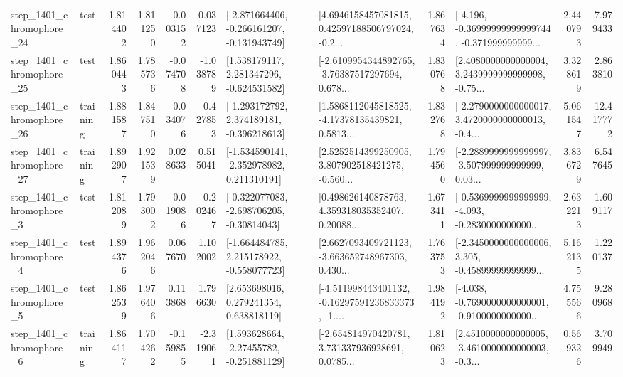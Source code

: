 \begin{tabular}{llrrrrllrlrr}
 step\_1401\_chromophore\_24 &      test &      1.814402 &    1.811250 &     -0.003152 &  0.037123 &  [-2.871664406, -0.266161207, -0.131943749] &  [4.6946158457081815, 0.42597188506797024, -0.2... &       1.867634 &  [-4.196, -0.36999999999999744, -0.371999999999... &            2.440793 &          7.979433 \\
 step\_1401\_chromophore\_25 &      test &      1.860443 &    1.785736 &     -0.074708 & -1.038789 &    [1.538179117, 2.281347296, -0.624531582] &  [-2.6109954344892765, -3.76387517297694, 0.678... &       1.830768 &  [2.4080000000000004, 3.2439999999999998, -0.75... &            3.328619 &          2.863810 \\
 step\_1401\_chromophore\_26 &  training &      1.881587 &    1.847510 &     -0.034076 & -0.427853 &   [-1.293172792, 2.374189181, -0.396218613] &  [1.5868112045818525, -4.17378135439821, 0.5813... &       1.832768 &  [-2.2790000000000017, 3.4720000000000013, -0.4... &            5.061547 &         12.417772 \\
 step\_1401\_chromophore\_27 &  training &      1.892907 &    1.921539 &      0.028633 &  0.515041 &   [-1.534590141, -2.352978982, 0.211310191] &  [2.5252514399250905, 3.807902518421275, -0.560... &       1.794560 &  [-2.2889999999999997, -3.507999999999999, 0.03... &            3.836729 &          6.547645 \\
  step\_1401\_chromophore\_3 &      test &      1.812089 &    1.793002 &     -0.019086 & -0.202467 &   [-0.322077083, -2.698706205, -0.30814043] &  [0.498626140878763, 4.359318035352407, 0.20088... &       1.673411 &  [-0.5369999999999999, -4.093, -0.2830000000000... &            2.632213 &          1.609117 \\
  step\_1401\_chromophore\_4 &      test &      1.894376 &    1.962046 &      0.067670 &  1.102002 &   [-1.664484785, 2.215178922, -0.558077723] &  [2.6627093409721123, -3.663652748967303, 0.430... &       1.763753 &  [-2.3450000000000006, 3.305, -0.45899999999999... &            5.162135 &          1.220137 \\
  step\_1401\_chromophore\_5 &      test &      1.862539 &    1.976406 &      0.113868 &  1.796630 &     [2.653698016, 0.279241354, 0.638818119] &  [-4.511998443401132, -0.16297591236833373, -1.... &       1.984192 &  [-4.038, -0.7690000000000001, -0.9100000000000... &            4.755566 &          9.280968 \\
  step\_1401\_chromophore\_6 &  training &      1.864117 &    1.704262 &     -0.159855 & -2.319061 &    [1.593628664, -2.27455782, -0.251881129] &  [-2.654814970420781, 3.731337936928691, 0.0785... &       1.810623 &  [2.4510000000000005, -3.4610000000000003, -0.3... &            0.569326 &          3.709949 \\

\end{tabular}
